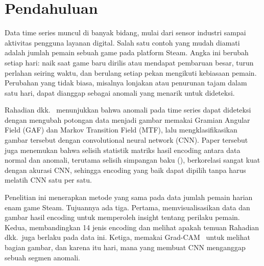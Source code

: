 \section{Pendahuluan}

Data time series muncul di banyak bidang, mulai dari sensor industri sampai aktivitas pengguna layanan digital. Salah satu contoh yang mudah diamati adalah jumlah pemain sebuah game pada platform Steam. Angka ini berubah setiap hari: naik saat game baru dirilis atau mendapat pembaruan besar, turun perlahan seiring waktu, dan berulang setiap pekan mengikuti kebiasaan pemain. Perubahan yang tidak biasa, misalnya lonjakan atau penurunan tajam dalam satu hari, dapat dianggap sebagai anomali yang menarik untuk dideteksi.

Rahadian dkk.~\cite{rahadian2023} menunjukkan bahwa anomali pada time series dapat dideteksi dengan mengubah potongan data menjadi gambar memakai Gramian Angular Field (GAF) dan Markov Transition Field (MTF), lalu mengklasifikasikan gambar tersebut dengan convolutional neural network (CNN). Paper tersebut juga menemukan bahwa selisih statistik matriks hasil encoding antara data normal dan anomali, terutama selisih simpangan baku (\dsd), berkorelasi sangat kuat dengan akurasi CNN, sehingga encoding yang baik dapat dipilih tanpa harus melatih CNN satu per satu.

Penelitian ini menerapkan metode yang sama pada data jumlah pemain harian enam game Steam. Tujuannya ada tiga. Pertama, memvisualisasikan data dan gambar hasil encoding untuk memperoleh insight tentang perilaku pemain. Kedua, membandingkan 14 jenis encoding dan melihat apakah temuan Rahadian dkk.\ juga berlaku pada data ini. Ketiga, memakai Grad-CAM~\cite{selvaraju2017} untuk melihat bagian gambar, dan karena itu hari, mana yang membuat CNN menganggap sebuah segmen anomali.